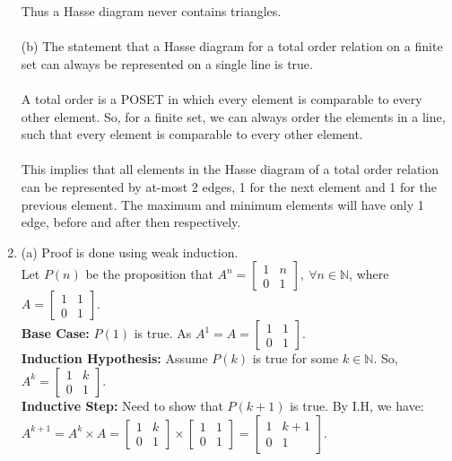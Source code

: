 \documentclass[a4paper]{article}
\begin{document}
\begin{enumerate}
Thus a Hasse diagram never contains triangles.\\
\\
(b) The statement that a Hasse diagram for a total order relation on a finite set can always be represented on a single line is true.\\
\\
A total order is a POSET in which every element is comparable to every other element. So, for a finite set, we can always order the elements in a line, such that every element is comparable to every other element.\\
\\
This implies that all elements in the Hasse diagram of a total order relation can be represented by at-most 2 edges, 1 for the next element and 1 for the previous element. The maximum and minimum elements will have only 1 edge, before and after then respectively.\\

\item (a) Proof is done using weak induction.\\
Let $P(n)$ be the proposition that $A^n = \begin{bmatrix}1 & n\\0 & 1\end{bmatrix},\ \forall n \in \mathbb{N}$, where $A = \begin{bmatrix}1 & 1\\0 & 1\end{bmatrix}$.\\

\textbf{Base Case:} $P(1)$ is true. As $A^1 = A = \begin{bmatrix}1 & 1\\0 & 1\end{bmatrix}$.\\

\textbf{Induction Hypothesis:} Assume $P(k)$ is true for some $k \in \mathbb{N}$. So, $A^k = \begin{bmatrix}1 & k\\0 & 1\end{bmatrix}$.\\

\textbf{Inductive Step:} Need to show that $P(k+1)$ is true. By I.H, we have:\\
$A^{k+1} = A^k \times A = \begin{bmatrix}1 & k\\0 & 1\end{bmatrix} \times \begin{bmatrix}1 & 1\\0 & 1\end{bmatrix} = \begin{bmatrix}1 & k+1\\0 & 1\end{bmatrix}$.\\


\end{enumerate}
\end{document}
